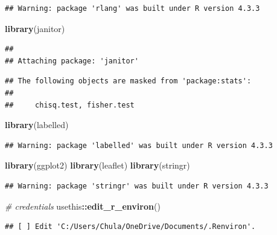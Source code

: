 \documentclass[
]{article}
\newenvironment{Shaded}{\begin{snugshade}}{\end{snugshade}}
\newcommand{\CommentTok}[1]{\textcolor[rgb]{0.56,0.35,0.01}{\textit{#1}}}
\newcommand{\FunctionTok}[1]{\textcolor[rgb]{0.13,0.29,0.53}{\textbf{#1}}}
\newcommand{\NormalTok}[1]{#1}
\newcommand{\SpecialCharTok}[1]{\textcolor[rgb]{0.81,0.36,0.00}{\textbf{#1}}}
\begin{document}
\begin{verbatim}
## Warning: package 'rlang' was built under R version 4.3.3
\end{verbatim}

\begin{Shaded}
\begin{Highlighting}[]
\FunctionTok{library}\NormalTok{(janitor)}
\end{Highlighting}
\end{Shaded}

\begin{verbatim}
## 
## Attaching package: 'janitor'
\end{verbatim}

\begin{verbatim}
## The following objects are masked from 'package:stats':
## 
##     chisq.test, fisher.test
\end{verbatim}

\begin{Shaded}
\begin{Highlighting}[]
\FunctionTok{library}\NormalTok{(labelled)}
\end{Highlighting}
\end{Shaded}

\begin{verbatim}
## Warning: package 'labelled' was built under R version 4.3.3
\end{verbatim}

\begin{Shaded}
\begin{Highlighting}[]
\FunctionTok{library}\NormalTok{(ggplot2)}
\FunctionTok{library}\NormalTok{(leaflet)}
\FunctionTok{library}\NormalTok{(stringr)}
\end{Highlighting}
\end{Shaded}

\begin{verbatim}
## Warning: package 'stringr' was built under R version 4.3.3
\end{verbatim}

\begin{Shaded}
\begin{Highlighting}[]
\CommentTok{\# credentials}
\NormalTok{usethis}\SpecialCharTok{::}\FunctionTok{edit\_r\_environ}\NormalTok{()}
\end{Highlighting}
\end{Shaded}

\begin{verbatim}
## [ ] Edit 'C:/Users/Chula/OneDrive/Documents/.Renviron'.
\end{verbatim}
\end{document}
